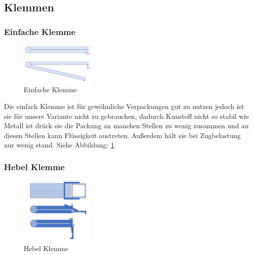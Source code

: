 \subsection{Klemmen}
\subsubsection{Einfache Klemme}

\begin{figure}
\vspace{-20pt}
  \begin{center}
    \includegraphics[width=0.32\textwidth]{Bilder/Powerpoint/Einfach_Klemme}
  \end{center}
  \caption{Einfache Klemme}
  \label{Einfache Klemme}
  \vspace{-10pt}
\end{figure}

Die einfach Klemme ist für gewöhnliche Verpackungen gut zu nutzen jedoch ist sie für unsere Variante nicht zu gebrauchen, dadurch Kunstoff nicht so stabil wie Metall ist drück sie die Packung an manchen Stellen zu wenig zusammen und an diesen Stellen kann Flüssigkeit austreten. Außerdem hält sie bei Zugbelastung nur wenig stand. Siehe Abbildung: \ref{Einfache Klemme}

\subsubsection{Hebel Klemme} 

\begin{figure}
\vspace{-30pt}
  \begin{center}
    \includegraphics[width=0.32\textwidth]{Bilder/Powerpoint/Hebel_Klemme}
  \end{center}
  \caption{Hebel Klemme}
  \label{Hebel Klemme}
  \vspace{-10pt}
\end{figure}


